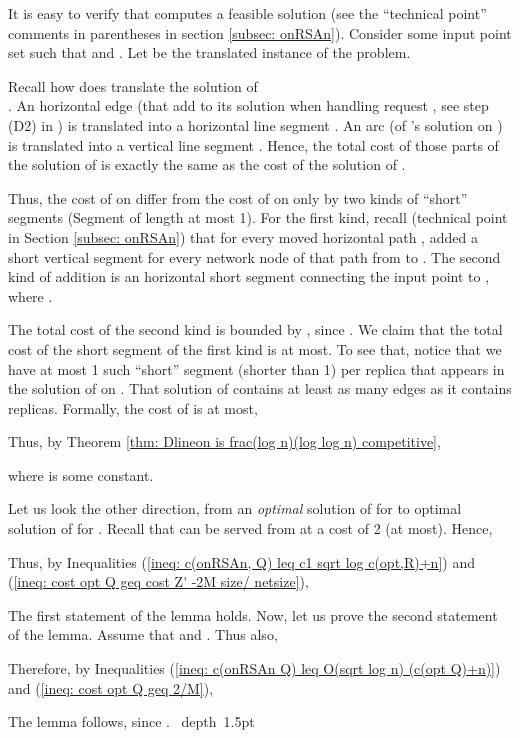 \documentclass[11pt]{article}
\def\proof{\par\noindent{\bf Proof:~}}
\def\blackslug{\hbox{\hskip 1pt \vrule width 4pt height 8pt
    depth 1.5pt \hskip 1pt}}
\def\QED{\quad\blackslug\lower 8.5pt\null\par}
\begin{document}
\def\ProofLEMMAonRSAnLOGcomp{
\proof
It is easy to verify that  computes a feasible solution (see the ``technical point'' comments in parentheses in section \ref{subsec: onRSAn}).
Consider some input point set  such that 
and .
Let  be the translated instance of the  problem.


Recall how does  translate the solution of
\commdouble\\\commdoubleend
.
An horizontal edge  (that  add to its solution when handling request , see step (D2) in )
is translated into a horizontal line segment .
An arc  (of 's solution on ) is translated into a vertical line segment .
Hence, the total cost of those parts of the solution of  is exactly the same as the cost of the solution of .



Thus, the cost of  on  differ from the cost of  on  only by
two kinds of ``short'' segments (Segment of length at most 1).
For the first kind, recall (technical point in Section \ref{subsec: onRSAn})
that for every moved horizontal path ,
 added a short vertical segment for every network node  of that path from  to .
The second kind of addition is an horizontal short segment connecting the input point  to , where .



The total cost of the second kind is bounded by , since .
We claim that the total cost of the short segment of the first kind is  at most.
To see that, notice that we have at most 1 such ``short'' segment (shorter than 1) per replica that appears in the solution of  on .
That solution of  contains at least as many edges as it contains replicas.
Formally, the cost of  is at most,
\commsingle

\commsingleend
\commdouble

\commdoubleend
Thus, by Theorem \ref{thm: Dlineon is frac(log n)(log log n) competitive},

where  is some constant.


Let us look the other direction, from an {\em optimal} solution of  for  to optimal solution of  for .
Recall that  can be served from  at a cost of 2 (at most).
Hence,

Thus, by Inequalities (\ref{ineq: c(onRSAn, Q) leq c1 sqrt log c(opt,R)+n}) and (\ref{ineq: cost opt Q geq cost Z' -2M size/ netsize}),
\commsingle

\commsingleend
\commdouble

\commdoubleend
The first statement of the lemma holds.
Now, let us prove the second statement of the lemma.
Assume that  and .
Thus also,

Therefore, by Inequalities (\ref{ineq: c(onRSAn Q) leq O(sqrt log n) (c(opt Q)+n)}) and (\ref{ineq: cost opt Q geq 2/M}),
\commsingle

\commsingleend
\commdouble

\commdoubleend
The lemma follows, since .
\QED
}\ProofLEMMAonRSAnLOGcomp
\end{document}
